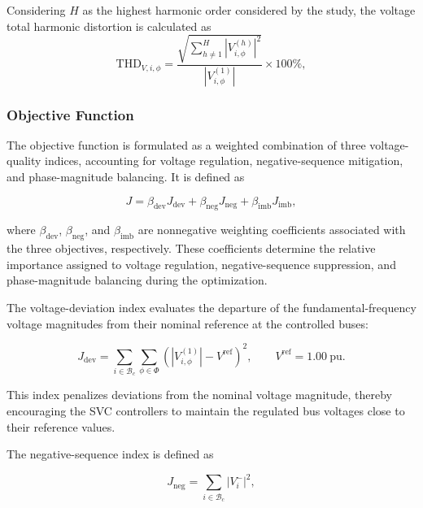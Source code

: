 \documentclass[journal]{IEEEtran}
\begin{document}
Considering $H$ as the highest harmonic order considered by the study, the voltage total harmonic distortion is
calculated as
\begin{equation}
    \mathrm{THD}_{V,i,\phi} =
    \frac{\sqrt{\displaystyle\sum_{h\neq 1}^{H}
    |V_{i,\phi}^{(h)}|^2}}
    {|V_{i,\phi}^{(1)}|}\times 100\%,
    \label{eq:thd}
\end{equation}




\subsubsection{Objective Function}

The objective function is formulated as a weighted combination of
three voltage-quality indices, accounting for voltage regulation,
negative-sequence mitigation, and phase-magnitude balancing. It is
defined as

\begin{equation}
    J=\beta_{\mathrm{dev}}J_{\mathrm{dev}}+
    \beta_{\mathrm{neg}}J_{\mathrm{neg}}+
    \beta_{\mathrm{imb}}J_{\mathrm{imb}},
    \label{eq:objective}
\end{equation}

where $\beta_{\mathrm{dev}}$, $\beta_{\mathrm{neg}}$, and $\beta_{\mathrm{imb}}$
are nonnegative weighting coefficients associated with the three
objectives, respectively. These coefficients determine the relative
importance assigned to voltage regulation, negative-sequence
suppression, and phase-magnitude balancing during the optimization.

The voltage-deviation index evaluates the departure of the
fundamental-frequency voltage magnitudes from their nominal reference
at the controlled buses:

\begin{equation}
    J_{\mathrm{dev}}=
    \sum_{i\in\mathcal{B}_c}\sum_{\phi\in\Phi}
    \left(|V_{i,\phi}^{(1)}|-V^{\mathrm{ref}}\right)^2,
    \qquad V^{\mathrm{ref}}=1.00\ \mathrm{pu}.
    \label{eq:voltage_deviation_index}
\end{equation}

This index penalizes deviations from the nominal voltage magnitude,
thereby encouraging the SVC controllers to maintain the regulated
bus voltages close to their reference values.

The negative-sequence index is defined as

\begin{equation}
    J_{\mathrm{neg}}=
    \sum_{i\in\mathcal{B}_c}|V_i^{-}|^2,
    \label{eq:negative_sequence_index}
\end{equation}
\end{document}
